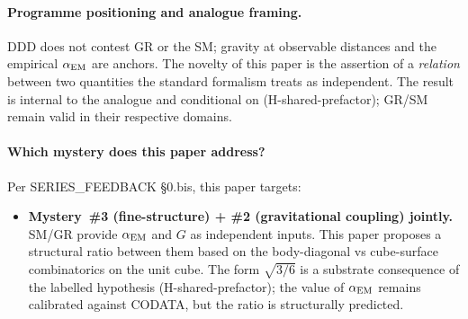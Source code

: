 \documentclass[11pt,a4paper]{article}
\begin{document}
\noindent{}
\bigskip


\paragraph{Programme positioning and analogue framing.}
DDD does not contest GR or the SM; gravity at observable distances and the empirical $\alpha_{\rm EM}$ are anchors. The novelty of this paper is the assertion of a \emph{relation} between two quantities the standard formalism treats as independent. The result is internal to the analogue and conditional on (H-shared-prefactor); GR/SM remain valid in their respective domains.


\paragraph{Which mystery does this paper address?}
Per SERIES\_FEEDBACK §0.bis, this paper targets:

\begin{itemize}
\item \textbf{Mystery~\#3 (fine-structure) + \#2 (gravitational coupling) jointly.} SM/GR provide $\alpha_{\rm EM}$ and $G$ as independent inputs. This paper proposes a structural ratio between them based on the body-diagonal vs cube-surface combinatorics on the unit cube. The form $\sqrt{3/6}$ is a substrate consequence of the labelled hypothesis (H-shared-prefactor); the value of $\alpha_{\rm EM}$ remains calibrated against CODATA, but the ratio is structurally predicted.
\end{itemize}
\end{document}

